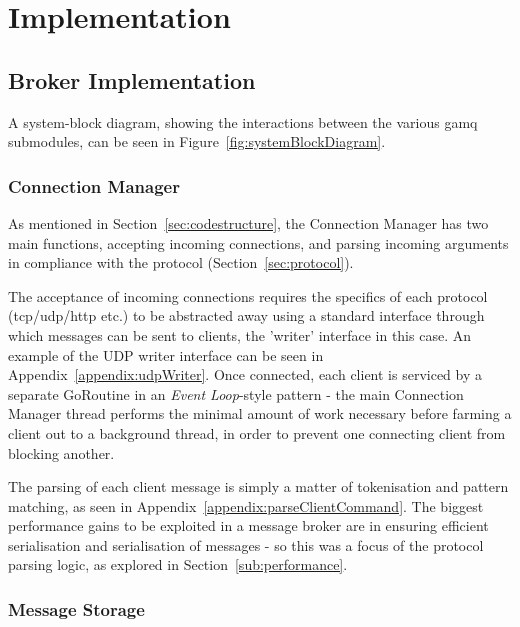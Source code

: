 \chapter{Implementation}
\label{chap:Implementation}

\section{Broker Implementation}
\label{sec:Broker Implementation}

A system-block diagram, showing the interactions between the various gamq
submodules, can be seen in Figure~\ref{fig:systemBlockDiagram}.

\subsection{Connection Manager}
\label{sub:connectionManager}

As mentioned in Section~\ref{sec:codestructure}, the Connection Manager has two
main functions, accepting incoming connections, and parsing incoming arguments
in compliance with the protocol (Section~\ref{sec:protocol}).

The acceptance of incoming connections requires the specifics of each protocol
(\gls{tcp}/\gls{udp}/\gls{http} etc.) to be abstracted away using a standard
interface through which messages can be sent to clients, the 'writer' interface
in this case. An example of the UDP writer interface can be seen in
Appendix~\ref{appendix:udpWriter}. Once connected, each client is serviced by a
separate GoRoutine in an \emph{Event Loop}-style pattern - the main Connection
Manager thread performs the minimal amount of work necessary before farming a
client out to a background thread, in order to prevent one connecting client
from blocking another.

The parsing of each client message is simply a matter of tokenisation and
pattern matching, as seen in Appendix~\ref{appendix:parseClientCommand}. The
biggest performance gains to be exploited in a message broker are in ensuring
efficient serialisation and serialisation of messages - so this was a focus of
the protocol parsing logic, as explored in Section~\ref{sub:performance}.


\subsection{Message Storage}
\label{sub:messageStorage}


